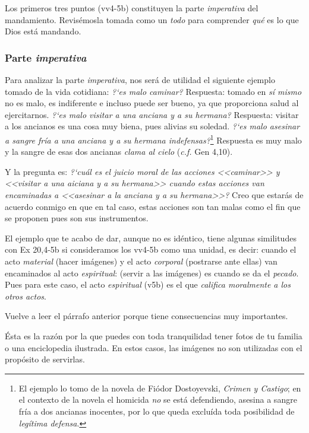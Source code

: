 \documentclass{article}
\begin{document}
\noindent
Los primeros tres puntos (vv4-5b) constituyen la parte \emph{imperativa} del mandamiento. Revis\'emosla tomada como un \emph{todo} para comprender \emph{qu\'e} es lo que Dios est\'a mandando.

\subsubsection{Parte \emph{imperativa}}

Para analizar la parte \emph{imperativa}, nos ser\'a de utilidad el siguiente ejemplo tomado de la vida cotidiana: \emph{?`es malo caminar?} Respuesta: tomado en \emph{s\'i mismo} no es malo, es indiferente e incluso puede ser bueno, ya que proporciona salud al ejercitarnos. \emph{?`es malo visitar a una anciana y a su hermana?} Respuesta: visitar a los ancianos es una cosa muy biena, pues alivias su soledad. \emph{?`es malo asesinar a sangre fr\'{i}a a una anciana y a su hermana indefensas?}\footnote{El ejemplo lo tomo de la novela de Fiódor Dostoyevski, \emph{Crimen y Castigo}; en el contexto de la novela el homicida \emph{no} se est\'a defendiendo, asesina a sangre fr\'{i}a a dos ancianas inocentes, por lo que queda exclu\'{i}da toda posibilidad de \emph{leg\'{i}tima defensa}.} Respuesta es muy malo y la sangre de esas dos ancianas \emph{clama al cielo} (\emph{c.f.} Gen 4,10).

Y la pregunta es: \emph{?`cu\'al es el juicio moral de las acciones <<caminar>> y <<visitar a una aiciana y a su hermana>> cuando estas acciones van encaminadas a <<asesinar a la anciana y a su hermana>>?} Creo que estar\'as de acuerdo conmigo en que en tal caso, estas acciones son tan malas como el fin que se proponen pues son sus instrumentos.

El ejemplo que te acabo de dar, aunque no es id\'entico, tiene algunas similitudes con Ex 20,4-5b si consideramos los vv4-5b como una unidad, es decir: cuando el acto \emph{material} (hacer im\'agenes) y el acto \emph{corporal} (postrarse ante ellas) van encaminados al acto \emph{espiritual}: (servir a las im\'agenes) es cuando se da el \emph{pecado}. Pues para este caso, el acto \emph{espiritual} (v5b) es el que \emph{califica moralmente a los otros actos}.

Vuelve a leer el p\'arrafo anterior porque tiene consecuencias muy importantes.

\'Esta es la raz\'on por la que puedes con toda tranquilidad tener fotos de tu familia o una enciclopedia ilustrada. En estos casos, las im\'agenes no son utilizadas con el prop\'osito de servirlas.
\end{document}
